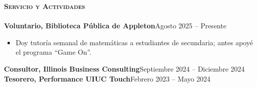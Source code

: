 \documentclass[a4paper]{article}
\newcommand{\lineunder}{
    \vspace*{-8pt} \\
    \hspace*{-18pt} \hrulefill \\
}
\newcommand{\header}[1]{
    \Needspace{4\baselineskip}
    {\hspace*{-18pt}\vspace*{5pt} \textsc{#1}}
    \vspace*{-6pt} \lineunder
}
\begin{document}
\vspace*{1mm}
\header{\textbf{Servicio y Actividades}}
\textbf{Voluntario, Biblioteca Pública de Appleton}\hfill Agosto 2025 -- Presente
\begin{itemize}[noitemsep]
    \item Doy tutoría semanal de matemáticas a estudiantes de secundaria; antes apoyé el programa ``Game On''.
\end{itemize}
\textbf{Consultor, Illinois Business Consulting}\hfill Septiembre 2024 -- Diciembre 2024\\
\textbf{Tesorero, Performance UIUC Touch}\hfill Febrero 2023 -- Mayo 2024
\end{document}
